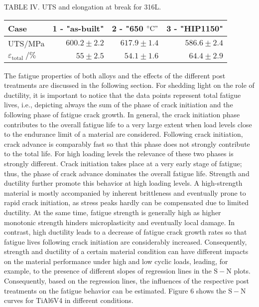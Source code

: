 \documentclass[10pt]{article}
\begin{document}
TABLE IV. UTS and elongation at break for 316L.

\begin{center}
\begin{tabular}{lrrr}
\hline\hline
Case & 1 - "as-built" & 2 - "650 ${ }^{\circ} \mathrm{C} "$ & 3 - "HIP1150" \\
\hline
UTS/MPa & $600.2 \pm 2.2$ & $617.9 \pm 1.4$ & $586.6 \pm 2.4$ \\
$\varepsilon_{\text {total }} / \%$ & $55 \pm 2.5$ & $54.1 \pm 1.6$ & $64.4 \pm 2.9$ \\
\hline\hline
\end{tabular}
\end{center}

The fatigue properties of both alloys and the effects of the different post treatments are discussed in the following section. For shedding light on the role of ductility, it is important to notice that the data points represent total fatigue lives, i.e., depicting always the sum of the phase of crack initiation and the following phase of fatigue crack growth. In general, the crack initiation phase contributes to the overall fatigue life to a very large extent when load levels close to the endurance limit of a material are considered. Following crack initiation, crack advance is comparably fast so that this phase does not strongly contribute to the total life. For high loading levels the relevance of these two phases is strongly different. Crack initiation takes place at a very early stage of fatigue; thus, the phase of crack advance dominates the overall fatigue life. Strength and ductility further promote this behavior at high loading levels. A high-strength material is mostly accompanied by inherent brittleness and eventually prone to rapid crack initiation, as stress peaks hardly can be compensated due to limited ductility. At the same time, fatigue strength is generally high as higher monotonic strength hinders microplasticity and eventually local damage. In contrast, high ductility leads to a decrease of fatigue crack growth rates so that fatigue lives following crack initiation are considerably increased. Consequently, strength and ductility of a certain material condition can have different impacts on the material performance under high and low cyclic loads, leading, for example, to the presence of different slopes of regression lines in the $\mathrm{S}-\mathrm{N}$ plots. Consequently, based on the regression lines, the influences of the respective post treatments on the fatigue behavior can be estimated. Figure 6 shows the $\mathrm{S}-\mathrm{N}$ curves for TiAl6V4 in different conditions.
\end{document}
